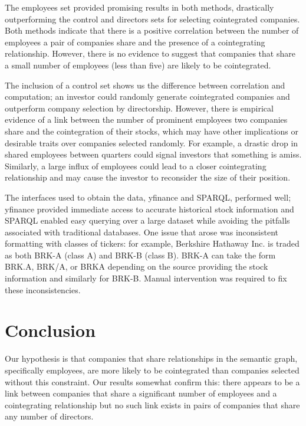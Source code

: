 \documentclass{UoYCSproject}
\begin{document}
The employees set provided promising results in both methods, drastically outperforming the control and directors sets for selecting cointegrated companies. Both methods indicate that there is a positive correlation between the number of employees a pair of companies share and the presence of a cointegrating relationship. However, there is no evidence to suggest that companies that share a small number of employees (less than five) are likely to be cointegrated.

The inclusion of a control set shows us the difference between correlation and computation; an investor could randomly generate cointegrated companies and outperform company selection by directorship. However, there is empirical evidence of a link between the number of prominent employees two companies share and the cointegration of their stocks, which may have other implications or desirable traits over companies selected randomly. For example, a drastic drop in shared employees between quarters could signal investors that something is amiss. Similarly, a large influx of employees could lead to a closer cointegrating relationship and may cause the investor to reconsider the size of their position.

The interfaces used to obtain the data, yfinance and SPARQL, performed well; yfinance provided immediate access to accurate historical stock information and SPARQL enabled easy querying over a large dataset while avoiding the pitfalls associated with traditional databases. One issue that arose was inconsistent formatting with classes of tickers: for example, Berkshire Hathaway Inc. is traded as both BRK-A (class A) and BRK-B (class B). BRK-A can take the form BRK.A, BRK/A, or BRKA depending on the source providing the stock information and similarly for BRK-B. Manual intervention was required to fix these inconsistencies.

\chapter{Conclusion}
\label{cha:conclusion}

Our hypothesis is that companies that share relationships in the semantic graph, specifically employees, are more likely to be cointegrated than companies selected without this constraint. Our results somewhat confirm this: there appears to be a link between companies that share a significant number of employees and a cointegrating relationship but no such link exists in pairs of companies that share any number of directors.
\end{document}
